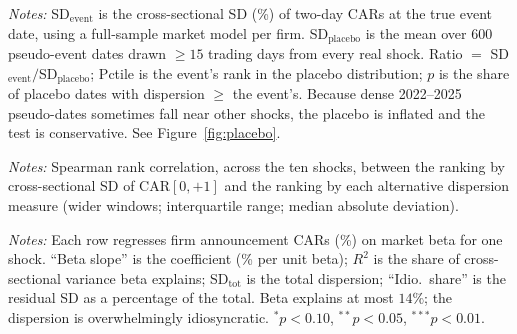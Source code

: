 \documentclass[12pt]{article}
\begin{document}
\begin{table}[htbp]\centering
\begin{threeparttable}
\caption{Differentiation is real: event-window dispersion vs.\ a placebo distribution}
\label{tab:diff}\small

\begin{tablenotes}\small\item \textit{Notes:} SD$_{\text{event}}$ is the cross-sectional SD (\%) of
two-day CARs at the true event date, using a full-sample market model per firm. SD$_{\text{placebo}}$
is the mean over $600$ pseudo-event dates drawn $\geq 15$ trading days from every real shock.
Ratio $=$ SD$_{\text{event}}/$SD$_{\text{placebo}}$; Pctile is the event's rank in the placebo
distribution; $p$ is the share of placebo dates with dispersion $\geq$ the event's. Because dense
2022--2025 pseudo-dates sometimes fall near other shocks, the placebo is inflated and the test is
conservative. See Figure~\ref{fig:placebo}.
\end{tablenotes}
\end{threeparttable}
\end{table}

\begin{table}[htbp]\centering
\begin{threeparttable}
\caption{The differentiation ranking is robust to window and statistic}\label{tab:rankcorr}\small

\begin{tablenotes}\small\item \textit{Notes:} Spearman rank correlation, across the ten shocks,
between the ranking by cross-sectional SD of CAR$[0,+1]$ and the ranking by each alternative
dispersion measure (wider windows; interquartile range; median absolute deviation).
\end{tablenotes}
\end{threeparttable}
\end{table}

\begin{table}[htbp]\centering
\begin{threeparttable}
\caption{Systematic vs.\ idiosyncratic differentiation (CARs on market beta, per shock)}
\label{tab:beta}\small

\begin{tablenotes}\small\item \textit{Notes:} Each row regresses firm announcement CARs (\%) on
market beta for one shock. ``Beta slope'' is the coefficient (\% per unit beta); $R^2$ is the share
of cross-sectional variance beta explains; SD$_{\text{tot}}$ is the total dispersion; ``Idio.\
share'' is the residual SD as a percentage of the total. Beta explains at most $14\%$; the
dispersion is overwhelmingly idiosyncratic. $^{*}p<0.10$, $^{**}p<0.05$, $^{***}p<0.01$.
\end{tablenotes}
\end{threeparttable}
\end{table}
\end{document}
